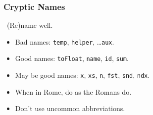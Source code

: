 \begin{frame}

\frametitle{Cryptic Names}

\begin{center}

\leftthumbsup~(Re)name well.~\rightthumbsup

\end{center}

\vspace{\fill}

\begin{itemize}

\item Bad names: \texttt{temp}, \texttt{helper}, \ldots \texttt{aux}.

\item Good names: \texttt{toFloat}, \texttt{name}, \texttt{id}, \texttt{sum}.

\item May be good names: \texttt{x}, \texttt{xs}, \texttt{n}, \texttt{fst},
\texttt{snd}, \texttt{ndx}.

\item When in Rome, do as the Romans do.

\item Don't use uncommon abbreviations.

\end{itemize}

\end{frame}
